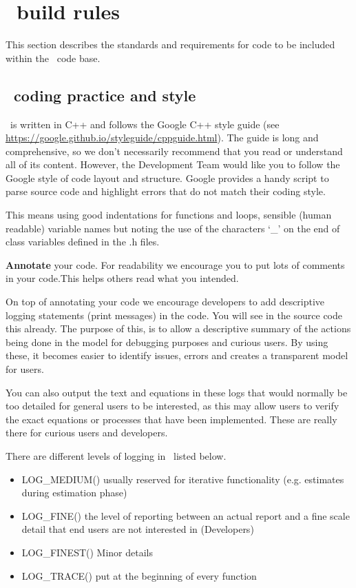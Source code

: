 \section{\CNAME\ build rules\label{sec:build_rules}}

This section describes the standards and requirements for code to be included within the \CNAME\ code base. 

\subsection{\CNAME\ coding practice and style}\label{subsec:code_practive}

\CNAME\ is written in C++ and follows the Google C++ style guide (see \url{https://google.github.io/styleguide/cppguide.html}). The guide is long and comprehensive, so we don't necessarily recommend that you read or understand all of its content. However, the Development Team would like you to follow the Google style of code layout and structure. Google provides a handy script to parse source code and highlight errors that do not match their coding style.

This means using good indentations for functions and loops, sensible (human readable) variable names but noting the use of the characters `\_' on the end of class variables defined in the .h files. 

\textbf{Annotate} your code. For readability we encourage you to put lots of comments in your code.This helps others read what you intended. 

On top of annotating your code we encourage developers to add descriptive logging statements (print messages) in the code. You will see in the source code this already. The purpose of this, is to allow a descriptive summary of the actions being done in the model for debugging purposes and curious users. By using these, it becomes easier to identify issues, errors and creates a transparent model for users.

You can also output the text and equations in these logs that would normally be too detailed for general users to be interested, as this may allow users to verify the exact equations or processes that have been implemented. These are really there for curious users and developers.

There are different levels of logging in \CNAME\ listed below.
\begin{itemize}
	\item LOG\_MEDIUM()  usually reserved for iterative functionality (e.g. estimates during estimation phase)
	\item LOG\_FINE() the level of reporting between an actual report and a fine scale detail that end users are not interested in (Developers)
	\item LOG\_FINEST() Minor details
	\item LOG\_TRACE() put at the beginning of every function
\end{itemize}

